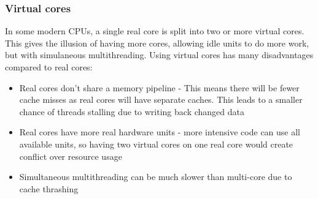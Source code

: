 \documentclass[CS4204-Notes.tex]{subfiles}
\begin{document}
\subsubsection{Virtual cores}
In some modern CPUs, a single real core is split into two or more virtual cores. This gives the illusion of having more cores, allowing idle units to do more work, but with simulaneous multithreading. Using virtual cores has many disadvantages compared to real cores:
\begin{itemize}
\item Real cores don't share a memory pipeline - This means there will be fewer cache misses as real cores will have separate caches. This leads to a smaller chance of threads stalling due to writing back changed data
\item Real cores have more real hardware units - more intensive code can use all available units, so having two virtual cores on one real core would create conflict over resource usage
\item Simultaneous multithreading can be much slower than multi-core due to cache thrashing
\end{itemize}
\end{document}
